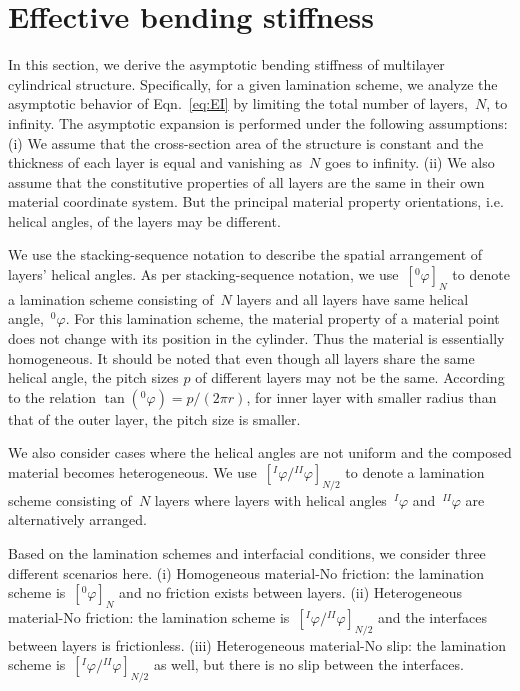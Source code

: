 \documentclass[preprint,10pt,times]{elsarticle}
\numberwithin{equation}{section}
\renewcommand{\>}{$\Rightarrow$}
\begin{document}
\section{Effective bending stiffness}
\label{sec:limit_analysis}
In this section, we derive the asymptotic bending stiffness of multilayer cylindrical structure.
Specifically, for a given lamination scheme, we analyze the asymptotic behavior of Eqn.~\eqref{eq:EI} by limiting the total number of layers,~$N$, to infinity.
The asymptotic expansion is performed under the following assumptions: (i) We assume that the cross-section area of the structure is constant and the thickness of each layer is equal and vanishing as~$N$ goes to infinity. (ii) We also assume that the constitutive properties of all layers are the same in their own material coordinate system. But the principal material property orientations, i.e. helical angles, of the layers may be different.

We use the stacking-sequence notation to describe the spatial arrangement of layers' helical angles. As per stacking-sequence notation, we use~$[{}^{0}\!\varphi]_N$ to denote a lamination scheme consisting of~$N$ layers and all layers have same helical angle,~${}^{0}\!\varphi$. 
For this lamination scheme, the material property of a material point does not change with its position in the cylinder. Thus the material is essentially homogeneous.
It should be noted that even though all layers share the same helical angle, the pitch sizes $p$ of different layers may not be the same. According to the relation $\tan{({}^{0}\!\varphi)} = p/(2\pi r )$, for inner layer with smaller radius than that of the outer layer, the pitch size is smaller.


We also consider cases where the helical angles are not uniform and the composed material becomes heterogeneous. We use~$[{}^{I}\!\varphi/{}^{II}\!\varphi]_{N/2}$ to denote a lamination scheme consisting of~$N$ layers where layers with helical angles~${}^{I}\!\varphi$ and~${}^{II}\!\varphi$ are alternatively arranged. 

Based on the lamination schemes and interfacial conditions, we consider three different scenarios here. (i) Homogeneous material-No friction: the lamination scheme is~$[{}^{0}\!\varphi]_N$ and no friction exists between layers. (ii) Heterogeneous material-No friction: the lamination scheme is~$[{}^{I}\!\varphi/{}^{II}\!\varphi]_{N/2}$ and the interfaces between layers is frictionless. (iii) Heterogeneous material-No slip: the lamination scheme is~$[{}^{I}\!\varphi/{}^{II}\!\varphi]_{N/2}$ as well, but there is no slip between the interfaces.
\end{document}
